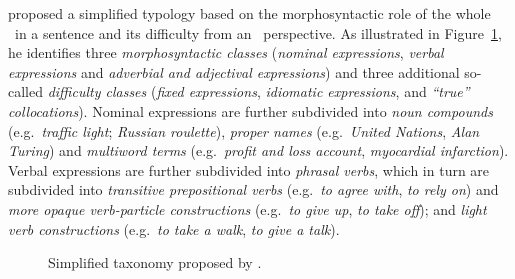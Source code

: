\documentclass[output=paper]{langsci/langscibook}
\begin{document}
\citet{Ramisch:2012,Ramisch:2015} proposed a simplified typology based on the morphosyntactic role of the whole \mwe\ in a sentence and its difficulty from an \nlp\ perspective. 
As illustrated in Figure~\ref{fig:Ramisch_taxonomy}, he identifies three \textit{morphosyntactic classes} (\textit{nominal expressions}, \textit{verbal expressions} and \textit{adverbial and adjectival expressions}) and three additional so-called \textit{difficulty classes} (\textit{fixed expressions}, \textit{idiomatic expressions}, and \textit{``true” collocations}). 
Nominal expressions are further subdivided into \textit{noun compounds} (e.g.\ \textit{traffic light}; \textit{Russian roulette}), 
\textit{proper names} (e.g.\ \textit{United Nations}, \textit{Alan Turing}) and \textit{multiword terms} (e.g.\ \textit{profit and loss account}, \textit{myocardial infarction}). 
Verbal expressions are further subdivided into \textit{phrasal verbs}, which in turn are subdivided into \textit{transitive prepositional verbs} (e.g.\ \textit{to agree with}, \textit{to rely on}) and \textit{more opaque verb-particle constructions} (e.g.\ \textit{to give up}, \textit{to take off}); and \textit{light verb constructions} (e.g.\ \textit{to take a walk}, \textit{to give a talk}). 

\begin{figure}[h]
\centering
{}
\caption{Simplified taxonomy proposed by \citet{Ramisch:2012,Ramisch:2015}.}
\label{fig:Ramisch_taxonomy}
\end{figure}
\end{document}
